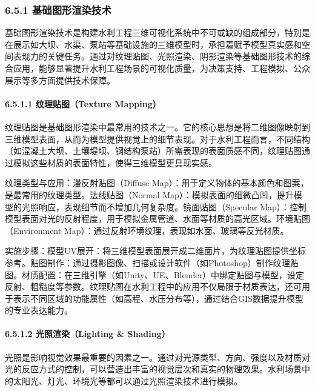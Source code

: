 \hypertarget{ux57faux7840ux56feux5f62ux6e32ux67d3ux6280ux672f}{%
\subsubsection{6.5.1 基础图形渲染技术}\label{ux57faux7840ux56feux5f62ux6e32ux67d3ux6280ux672f}}

基础图形渲染技术是构建水利工程三维可视化系统中不可或缺的组成部分，特别是在展示如大坝、水渠、泵站等基础设施的三维模型时，承担着赋予模型真实感和空间表现力的关键任务。通过对纹理贴图、光照渲染、阴影渲染等基础图形技术的综合应用，能够显著提升水利工程场景的可视化质量，为决策支持、工程模拟、公众展示等多方面提供技术保障。

\hypertarget{ux7eb9ux7406ux8d34ux56fetexture-mapping}{%
\paragraph{6.5.1.1 纹理贴图（Texture Mapping）}\label{ux7eb9ux7406ux8d34ux56fetexture-mapping}}

纹理贴图是基础图形渲染中最常用的技术之一。它的核心思想是将二维图像映射到三维模型表面，从而为模型提供视觉上的细节表现。对于水利工程而言，不同结构（如混凝土大坝、土壤堤坝、钢结构泵站）所需表现的表面质感不同，纹理贴图通过模拟这些材质的表面特性，使得三维模型更具现实感。

纹理类型与应用：漫反射贴图（Diffuse Map）：用于定义物体的基本颜色和图案，是最常用的纹理类型。法线贴图（Normal Map）：模拟表面的细微凸凹，提升模型的光照响应，表现细节而不增加几何复杂度。镜面贴图（Specular Map）：控制模型表面对光的反射程度，用于模拟金属管道、水面等材质的高光区域。环境贴图（Environment Map）：通过反射环境纹理，表现如水面、玻璃等反光材质。

实施步骤：模型UV展开：将三维模型表面展开成二维面片，为纹理贴图提供坐标参考。贴图制作：通过摄影图像、扫描或设计软件（如Photoshop）制作纹理贴图。材质配置：在三维引擎（如Unity、UE、Blender）中绑定贴图与模型，设定反射、粗糙度等参数。纹理贴图在水利工程中的应用不仅局限于材质表达，还可用于表示不同区域的功能属性（如高程、水压分布等），通过结合GIS数据提升模型的专业表达能力。

\hypertarget{ux5149ux7167ux6e32ux67d3lighting-shading}{%
\paragraph{6.5.1.2 光照渲染（Lighting \& Shading）}\label{ux5149ux7167ux6e32ux67d3lighting-shading}}

光照是影响视觉效果最重要的因素之一。通过对光源类型、方向、强度以及材质对光的反应方式的控制，可以营造出丰富的视觉层次和真实的物理效果。水利场景中的太阳光、灯光、环境光等都可以通过光照渲染技术进行模拟。


